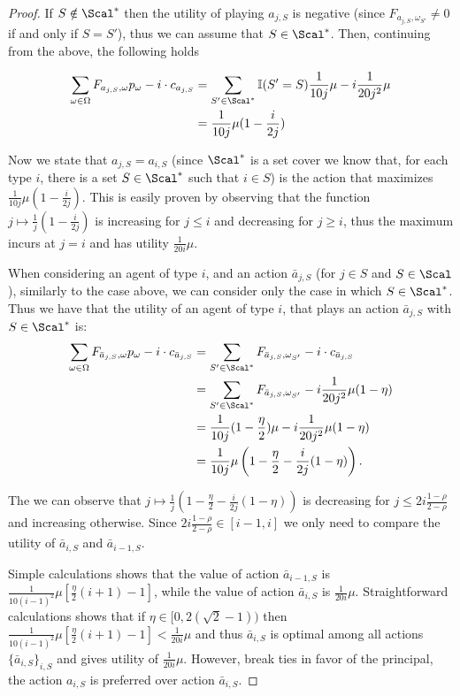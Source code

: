 \begin{proof}
	If $S\notin \Scal^*$ then the utility of playing $a_{j, S}$ is negative (since $F_{a_{j,S},\omega_{S'}}\neq 0$ if and only if $S=S'$), thus we can assume that $S\in \Scal^*$. Then, continuing from the above, the following holds
	
	\begin{align}
		\sum_{\omega \in \Omega} F_{ a_{j, S}, \omega } p_\omega - i \cdot c_{a_{j, S}} &=\sum_{S'\in\Scal^*} \mathbb{I}(S'=S)\frac{1}{10j}\mu- i\frac{1}{20 j^2}\mu\\
		&=\frac{1}{10j}\mu(1- \frac{i}{2j})
	\end{align}
	
	Now we state that $a_{j, S} = a_{i, S}$ (since $\Scal^*$ is a set cover we know that, for each type $i$, there is a set $S\in \Scal^*$ such that $i\in S$) is the action that maximizes $\frac{1}{10j}\mu(1- \frac{i}{2j})$. This is easily proven by observing that the function $j\mapsto \frac{1}{j}(1-\frac{i}{2j})$ is increasing for $j\le i$ and decreasing for $j\ge i$, thus the maximum incurs at $j=i$ and has utility $\frac{1}{20i}\mu$.
	
	When considering an agent of type $i$, and an action $\bar a_{j, S}$ (for $j\in S$ and $S\in\Scal$), similarly to the case above, we can consider only the case in which $S\in\Scal^*$. Thus we have that the utility of an agent of type $i$, that plays  an action $\bar a_{j, S}$ with $S\in\Scal^*$ is:
	\begin{align}
		\sum_{\omega \in \Omega} F_{ \bar a_{j, S}, \omega } p_\omega - i \cdot c_{\bar a_{j, S}} &= \sum_{S'\in\Scal^*} F_{ \bar a_{j, S}, {\omega_{S'}} }  - i \cdot c_{\bar a_{j, S}}\\
		&=\sum_{S'\in\Scal^*} F_{ \bar a_{j, S}, {\omega_{S'}} }  -i\frac{1}{20j^2}\mu(1-\eta) \\
		&=\frac{1}{10j}(1-\frac\eta2)\mu-i\frac{1}{20j^2}\mu(1-\eta) \\
		&=\frac{1}{10j}\mu\left(1-\frac{\eta}{2}-\frac{i}{2j}(1-\eta)\right).
 	\end{align}

	The we can observe that $j\mapsto \frac{1}{j}\left(1-\frac{\eta}{2}-\frac{i}{2j}(1-\eta)\right)$ is decreasing for $j\le 2i\frac{1-\rho}{2-\rho}$ and increasing otherwise. Since $2i\frac{1-\rho}{2-\rho}\in[i-1, i]$ we only need to compare the utility of $\bar a_{i, S}$ and $\bar a_{i-1, S}$.
	
	Simple calculations shows that the value of action $\bar a_{i-1, S}$ is $\frac{1}{10(i-1)^2}\mu\left[\frac{\eta}{2}(i+1)-1\right]$, while the value of action $\bar a_{i, S}$ is $\frac{1}{20i}\mu$. Straightforward calculations shows that if $\eta\in[0,2(\sqrt{2}-1))$ then $\frac{1}{10(i-1)^2}\mu\left[\frac{\eta}{2}(i+1)-1\right]<\frac{1}{20i}\mu$ and thus $\bar a_{i, S}$ is optimal among all actions $\{\bar a_{i, S}\}_{i, S}$ and gives utility of $\frac{1}{20i}\mu$. However, break ties in favor of the principal, the action $a_{i, S}$ is preferred over action $\bar a_{i, S}$.
	

\end{proof}
